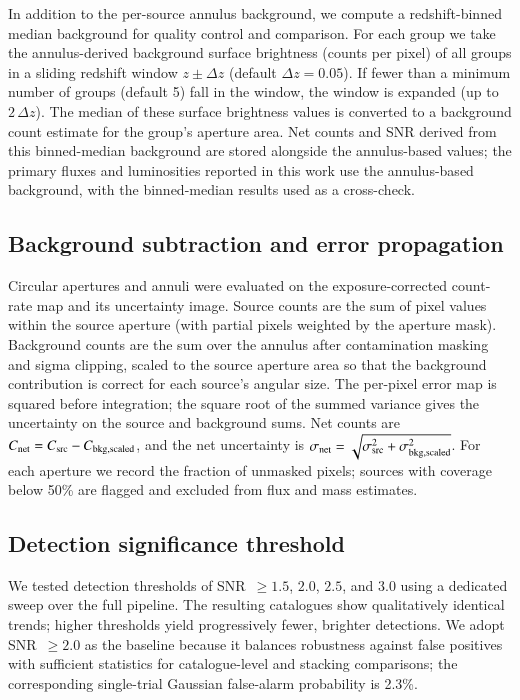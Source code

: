 \documentclass{aa}
\begin{document}
In addition to the per-source annulus background, we compute a redshift-binned median background for quality control and comparison. For each group we take the annulus-derived background surface brightness (counts per pixel) of all groups in a sliding redshift window $z \pm \Delta z$ (default $\Delta z = 0.05$). If fewer than a minimum number of groups (default 5) fall in the window, the window is expanded (up to $2\,\Delta z$). The median of these surface brightness values is converted to a background count estimate for the group's aperture area. Net counts and SNR derived from this binned-median background are stored alongside the annulus-based values; the primary fluxes and luminosities reported in this work use the annulus-based background, with the binned-median results used as a cross-check.

\subsection{Background subtraction and error propagation}
\label{sec:errprop}

Circular apertures and annuli were evaluated on the exposure-corrected count-rate map and its uncertainty image. Source counts are the sum of pixel values within the source aperture (with partial pixels weighted by the aperture mask). Background counts are the sum over the annulus after contamination masking and sigma clipping, scaled to the source aperture area so that the background contribution is correct for each source's angular size. The per-pixel error map is squared before integration; the square root of the summed variance gives the uncertainty on the source and background sums. Net counts are $C_{\rm net} = C_{\rm src} - C_{\rm bkg,scaled}$, and the net uncertainty is $\sigma_{\rm net} = \sqrt{\sigma_{\rm src}^2 + \sigma_{\rm bkg,scaled}^2}$. For each aperture we record the fraction of unmasked pixels; sources with coverage below 50\% are flagged and excluded from flux and mass estimates.

\subsection{Detection significance threshold}
\label{sec:detection}

We tested detection thresholds of SNR~$\geq 1.5$, $2.0$, $2.5$, and $3.0$ using a dedicated sweep over the full pipeline. The resulting catalogues show qualitatively identical trends; higher thresholds yield progressively fewer, brighter detections. We adopt SNR~$\geq 2.0$ as the baseline because it balances robustness against false positives with sufficient statistics for catalogue-level and stacking comparisons; the corresponding single-trial Gaussian false-alarm probability is 2.3\%.
\end{document}

